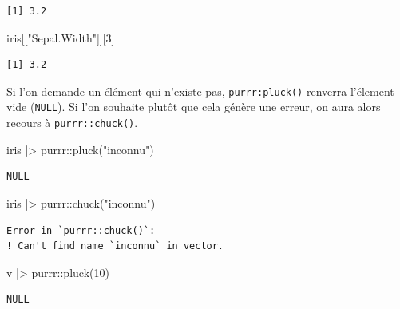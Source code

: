 \documentclass[
  letterpaper,
  DIV=11,
  numbers=noendperiod,
  oneside]{scrreprt}
\newenvironment{Shaded}{\begin{snugshade}}{\end{snugshade}}
\newcommand{\DecValTok}[1]{\textcolor[rgb]{0.68,0.00,0.00}{#1}}
\newcommand{\FunctionTok}[1]{\textcolor[rgb]{0.28,0.35,0.67}{#1}}
\newcommand{\NormalTok}[1]{\textcolor[rgb]{0.00,0.23,0.31}{#1}}
\newcommand{\SpecialCharTok}[1]{\textcolor[rgb]{0.37,0.37,0.37}{#1}}
\newcommand{\StringTok}[1]{\textcolor[rgb]{0.13,0.47,0.30}{#1}}
\begin{document}
\begin{verbatim}
[1] 3.2
\end{verbatim}

\begin{Shaded}
\begin{Highlighting}[]
\NormalTok{iris[[}\StringTok{"Sepal.Width"}\NormalTok{]][}\DecValTok{3}\NormalTok{]}
\end{Highlighting}
\end{Shaded}

\begin{verbatim}
[1] 3.2
\end{verbatim}

Si l'on demande un élément qui n'existe pas, \texttt{purrr:pluck()}
renverra l'élement vide (\texttt{NULL}). Si l'on souhaite plutôt que
cela génère une erreur, on aura alors recours à \texttt{purrr::chuck()}.

\begin{Shaded}
\begin{Highlighting}[]
\NormalTok{iris }\SpecialCharTok{|\textgreater{}}\NormalTok{ purrr}\SpecialCharTok{::}\FunctionTok{pluck}\NormalTok{(}\StringTok{"inconnu"}\NormalTok{)}
\end{Highlighting}
\end{Shaded}

\begin{verbatim}
NULL
\end{verbatim}

\begin{Shaded}
\begin{Highlighting}[]
\NormalTok{iris }\SpecialCharTok{|\textgreater{}}\NormalTok{ purrr}\SpecialCharTok{::}\FunctionTok{chuck}\NormalTok{(}\StringTok{"inconnu"}\NormalTok{)}
\end{Highlighting}
\end{Shaded}

\begin{verbatim}
Error in `purrr::chuck()`:
! Can't find name `inconnu` in vector.
\end{verbatim}

\begin{Shaded}
\begin{Highlighting}[]
\NormalTok{v }\SpecialCharTok{|\textgreater{}}\NormalTok{ purrr}\SpecialCharTok{::}\FunctionTok{pluck}\NormalTok{(}\DecValTok{10}\NormalTok{)}
\end{Highlighting}
\end{Shaded}

\begin{verbatim}
NULL
\end{verbatim}
\end{document}
